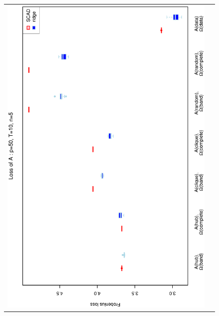 \documentclass[a4paper]{article}
\begin{document}
\begin{figure}[h!]
\centering
\begin{tabular}{cc}
\includegraphics[scale=0.45,angle=270]{LossA50T10N5_5.eps}\\

\end{tabular}
\end{figure}
\end{document}
